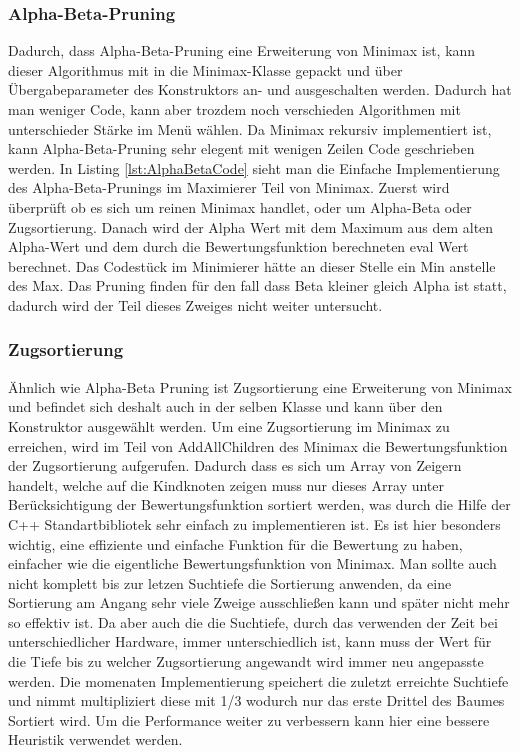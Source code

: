 \documentclass[12pt,a4paper,bibliography=totocnumbered,listof=totocnumbered]{article}
\begin{document}
\subsubsection{Alpha-Beta-Pruning}
Dadurch, dass Alpha-Beta-Pruning eine Erweiterung von Minimax ist, kann dieser Algorithmus mit in die Minimax-Klasse gepackt
und über Übergabeparameter des Konstruktors an- und ausgeschalten werden. Dadurch hat man weniger Code, kann aber trozdem noch 
verschieden Algorithmen mit unterschieder Stärke im Menü wählen. Da Minimax rekursiv implementiert ist, kann Alpha-Beta-Pruning sehr elegent mit wenigen 
Zeilen Code geschrieben werden. In Listing \ref{lst:AlphaBetaCode} sieht man die Einfache Implementierung des Alpha-Beta-Prunings im Maximierer Teil 
von Minimax. Zuerst wird überprüft ob es sich um reinen Minimax handlet, oder um Alpha-Beta oder Zugsortierung. Danach wird der Alpha Wert mit dem
Maximum aus dem alten Alpha-Wert und dem durch die Bewertungsfunktion berechneten eval Wert berechnet. Das Codestück im Minimierer hätte an dieser Stelle 
ein Min anstelle des Max. Das Pruning finden für den fall dass Beta kleiner gleich Alpha ist statt, dadurch wird der Teil dieses Zweiges nicht weiter untersucht.
\vspace{1em}


\subsubsection{Zugsortierung}
Ähnlich wie Alpha-Beta Pruning ist Zugsortierung eine Erweiterung von Minimax und befindet sich deshalt auch in der selben Klasse und kann über den 
Konstruktor ausgewählt werden. 
Um eine Zugsortierung im Minimax zu erreichen, wird im Teil von AddAllChildren des Minimax die Bewertungsfunktion der Zugsortierung aufgerufen.
Dadurch dass es sich um Array von Zeigern handelt, welche auf die Kindknoten zeigen muss nur dieses Array unter Berücksichtigung der Bewertungsfunktion
sortiert werden, was durch die Hilfe der C++ Standartbibliotek sehr einfach zu implementieren ist. Es ist hier besonders wichtig, eine effiziente und einfache Funktion für die 
Bewertung zu haben, einfacher wie die eigentliche Bewertungsfunktion von Minimax. Man sollte auch nicht komplett bis zur letzen Suchtiefe die Sortierung anwenden, 
da eine Sortierung am Angang sehr viele Zweige ausschließen kann und später nicht mehr so effektiv ist. Da aber auch die die Suchtiefe, durch das verwenden der Zeit bei 
unterschiedlicher Hardware, immer unterschiedlich ist, kann muss der Wert für die Tiefe bis zu welcher Zugsortierung angewandt wird immer neu angepasste werden.
Die momenaten Implementierung speichert die zuletzt erreichte Suchtiefe und nimmt multipliziert diese mit 1/3 wodurch nur das erste Drittel des Baumes Sortiert wird. 
Um die Performance weiter zu verbessern kann hier eine bessere Heuristik verwendet werden.
\end{document}
